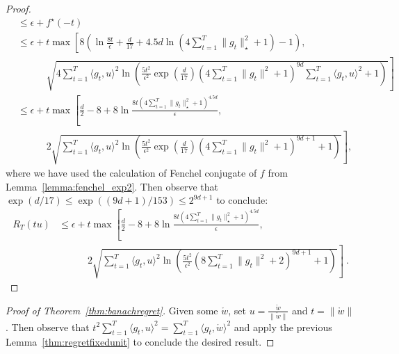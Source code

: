 \documentclass[12pt]{colt2018} %
\newcommand{\w}{\mathring{w}}
\begin{document}
\begin{proof}
\begin{align*}
&\le \epsilon+f^\star (-t)\\
&\le \epsilon+t 
\max\left[8 \left(\ln\frac{8t}{\epsilon}+\frac{d}{17}+4.5 d\ln\left(4\sum_{t=1}^T \|g_t\|^2_\star +1\right)-1\right),\right.\\
&\quad\quad\quad\left.\sqrt{4\sum_{t=1}^T \langle g_t,u\rangle^2 \ln\left(\frac{5t^2}{\epsilon^2}\exp\left(\frac{d}{17}\right)\left(4\sum_{t=1}^T \|g_t\|^2+1\right)^{9d}\sum_{t=1}^T \langle g_t,u\rangle^2+1\right)}\right]\\
&\le \epsilon+t 
\max\left[\frac{d}{2}-8+8\ln\frac{8t\left(4\sum_{t=1}^T \|g_t\|^2_\star +1\right)^{4.5d}}{\epsilon},\right.\\
&\quad\quad\quad\left.2\sqrt{\sum_{t=1}^T \langle g_t,u\rangle^2 \ln\left(\frac{5t^2}{\epsilon^2}\exp\left(\frac{d}{17}\right)\left(4\sum_{t=1}^T \|g_t\|^2+1\right)^{9d+1}+1\right)}\right],
\end{align*}
where we have used the calculation of Fenchel conjugate of $f$ from Lemma~\ref{lemma:fenchel_exp2}. Then observe that $\exp(d/17)\le \exp((9d+1)/153)\le 2^{9d+1}$ to conclude:
\begin{align*}
R_T(t u)&\le \epsilon+t 
\max\left[\frac{d}{2}-8+8\ln\frac{8t\left(4\sum_{t=1}^T \|g_t\|^2_\star +1\right)^{4.5d}}{\epsilon},\right.\\
&\quad\quad\quad\left.2\sqrt{\sum_{t=1}^T \langle g_t,u\rangle^2 \ln\left(\frac{5t^2}{\epsilon^2}\left(8\sum_{t=1}^T \|g_t\|^2+2\right)^{9d+1}+1\right)}\right]~.
\end{align*}
\end{proof}


\begin{proof}[Proof of Theorem~\ref{thm:banachregret}]
Given some $\w$, set $u = \frac{\w}{\|\w\|}$ and $t=\|\w\|$. Then observe that $t^2\sum_{t=1}^T \langle g_t,u\rangle^2=\sum_{t=1}^T \langle g_t,\w\rangle^2$ and apply the previous Lemma~\ref{thm:regretfixedunit} to conclude the desired result.
\end{proof}
\end{document}
